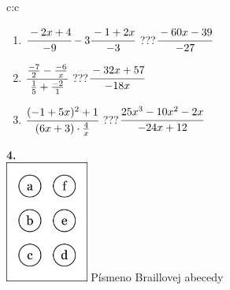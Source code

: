 \documentclass[10pt]{report}
\begin{document}
\begin{tabular}{c:c}
\begin{minipage}[c][104.5mm][t]{0.5\linewidth}
\begin{center}
\begin{minipage}{0.79\linewidth}
\begin{center}
\begin{varwidth}{\linewidth}
\begin{enumerate}
\item $\cfrac{-2x+4}{-9}-3\cfrac{-1+2x}{-3}$\quad \dotfill\; ???\;\dotfill \quad $\cfrac{-60x-39}{-27}$
\item $\cfrac{\frac{-7}{2}-\frac{-6}{x}}{\frac{1}{5}+\frac{-2}{1}}$\quad \dotfill\; ???\;\dotfill \quad $\cfrac{-32x+57}{-18x}$
\item $\cfrac{(-1+5x)^2+1}{(6x+3)\cdot\frac{4}{x}}$\quad \dotfill\; ???\;\dotfill \quad $\cfrac{25x^3-10x^2-2x}{-24x+12}$
\end{enumerate}
\end{varwidth}
\end{center}
\end{minipage}
\begin{minipage}{0.20\linewidth}
\begin{center}
{\Huge\bfseries 4.} \\[2mm]
\includegraphics[height=40mm]{../images/braille.png}
{\small Písmeno Braillovej abecedy}
\end{center}
\end{minipage}
\end{center}
\end{minipage}
%
\end{tabular}
\newpage
\thispagestyle{empty}
\end{document}
